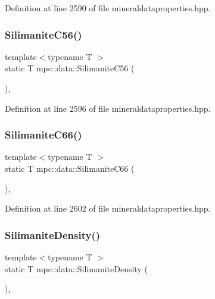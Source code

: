 Definition at line 2590 of file mineraldataproperties.\+hpp.

\mbox{\label{namespacempc_1_1data_aa35268644c996699ceadd796c39e8b57}} 
\subsubsection{\texorpdfstring{Silimanite\+C56()}{SilimaniteC56()}}
{\footnotesize\ttfamily template$<$typename T $>$ \\
static T mpc\+::data\+::\+Silimanite\+C56 (\begin{DoxyParamCaption}{ }\end{DoxyParamCaption})\hspace{0.3cm}{\ttfamily [inline]}, {\ttfamily [static]}}



Definition at line 2596 of file mineraldataproperties.\+hpp.

\mbox{\label{namespacempc_1_1data_a52d86be964f64f96ca7d72ea9d158c5a}} 
\subsubsection{\texorpdfstring{Silimanite\+C66()}{SilimaniteC66()}}
{\footnotesize\ttfamily template$<$typename T $>$ \\
static T mpc\+::data\+::\+Silimanite\+C66 (\begin{DoxyParamCaption}{ }\end{DoxyParamCaption})\hspace{0.3cm}{\ttfamily [inline]}, {\ttfamily [static]}}



Definition at line 2602 of file mineraldataproperties.\+hpp.

\mbox{\label{namespacempc_1_1data_ac0cb8a43cf54651d5a71bf932f83517d}} 
\subsubsection{\texorpdfstring{Silimanite\+Density()}{SilimaniteDensity()}}
{\footnotesize\ttfamily template$<$typename T $>$ \\
static T mpc\+::data\+::\+Silimanite\+Density (\begin{DoxyParamCaption}{ }\end{DoxyParamCaption})\hspace{0.3cm}{\ttfamily [inline]}, {\ttfamily [static]}}



